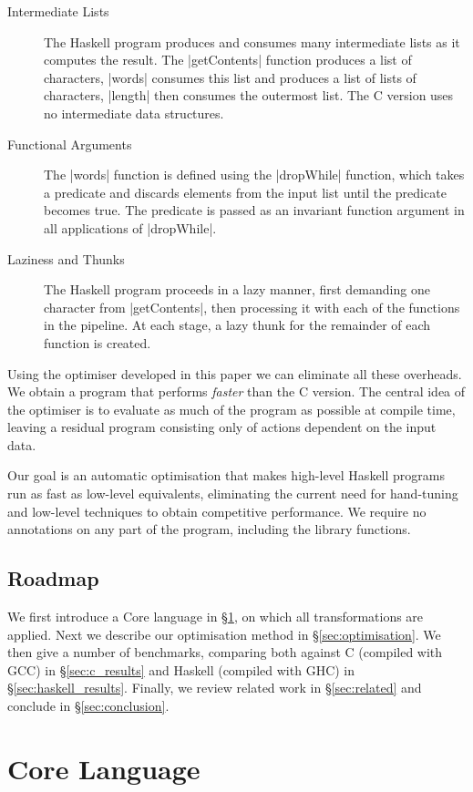 \documentclass{llncs}
\begin{document}
\begin{description}
\item[Intermediate Lists] The Haskell program produces and consumes many intermediate lists as it computes the result. The |getContents| function produces a list of characters, |words| consumes this list and produces a list of lists of characters, |length| then consumes the outermost list. The C version uses no intermediate data structures.
\item[Functional Arguments] The |words| function is defined using the |dropWhile| function, which takes a predicate and discards elements from the input list until the predicate becomes true. The predicate is passed as an invariant function argument in all applications of |dropWhile|.
\item[Laziness and Thunks] The Haskell program proceeds in a lazy manner, first demanding one character from |getContents|, then processing it with each of the functions in the pipeline. At each stage, a lazy thunk for the remainder of each function is created.
\end{description}

Using the optimiser developed in this paper we can eliminate all these overheads. We obtain a program that performs \textit{faster} than the C version. The central idea of the optimiser is to evaluate as much of the program as possible at compile time, leaving a residual program consisting only of actions dependent on the input data.

Our goal is an automatic optimisation that makes high-level Haskell programs run as fast as low-level equivalents, eliminating the current need for hand-tuning and low-level techniques to obtain competitive performance. We require no annotations on any part of the program, including the library functions.

\subsection{Roadmap}

We first introduce a Core language in \S\ref{sec:core}, on which all transformations are applied. Next we describe our optimisation method in \S\ref{sec:optimisation}. We then give a number of benchmarks, comparing both against C (compiled with GCC) in \S\ref{sec:c_results} and Haskell (compiled with GHC) in \S\ref{sec:haskell_results}. Finally, we review related work in \S\ref{sec:related} and conclude in \S\ref{sec:conclusion}.

\section{Core Language}
\label{sec:core}
\end{document}
